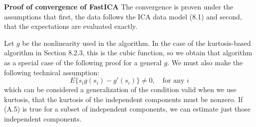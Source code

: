 \documentclass[12pt,a4paper,twoside,openany]{book}
\begin{document}
\begin{appendices}
    \vspace{1em}
    \noindent\textbf{Proof of convergence of FastICA} The convergence is proven under the assumptions that first, the data follows the ICA data model (8.1) and second, that the expectations are evaluated exactly.
    
    Let $g$ be the nonlinearity used in the algorithm. In the case of the kurtosis-based algorithm in Section 8.2.3, this is the cubic function, so we obtain that algorithm as a special case of the following proof for a general $g$. We must also make the following technical assumption:
    \begin{equation}
        E\{s_i g(s_i) - g'(s_i)\} \neq 0, \quad \text{for any } i \tag{A.5}
    \end{equation}
    which can be considered a generalization of the condition valid when we use kurtosis, that the kurtosis of the independent components must be nonzero. If (A.5) is true for a subset of independent components, we can estimate just those independent components.
    

\end{appendices}
\end{document}

